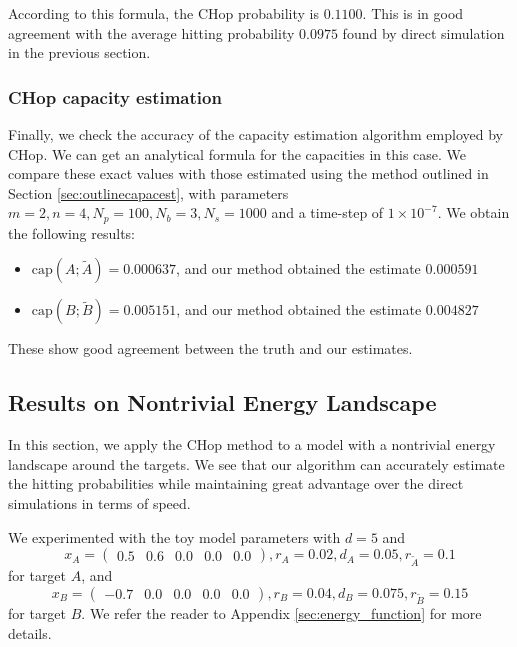 \documentclass[english, aip, jcp, priprint, graphicx,floatfix]{revtex4-1}
\theoremstyle{plain}
\theoremstyle{definition}
\theoremstyle{plain}
\newcommand{\capac}[2]{\mathrm{cap}\left(#1;#2\right)}
\begin{document}
According to this formula, the CHop probability is $0.1100$.  This is in good agreement with the average hitting probability $0.0975$ found by direct simulation in the previous section.


\subsubsection{CHop capacity estimation}



Finally, we check the accuracy of the capacity estimation algorithm employed by CHop.  We can get an analytical formula for the capacities in this case.  We compare these exact values with those estimated using the method outlined in Section \ref{sec:outlinecapacest}, with parameters $m = 2, n = 4, 
N_p = 100, N_b = 3,
N_s = 1000
$ and a time-step of $1 \times 10^{-7}$.  We obtain the following results:

\begin{itemize}
\item $\capac{A}{\tilde{A}}= 0.000637 $, and our method obtained the estimate $0.000591$ 
\item $\capac{B}{\tilde{B}}= 0.005151 $, and our method obtained the estimate $0.004827$ 
\end{itemize}

These show good agreement between the truth and our estimates.

\subsection{Results on Nontrivial Energy Landscape}




In this section, we apply the CHop method to a model with a nontrivial energy landscape around the targets. We see that our algorithm can accurately estimate the hitting probabilities while maintaining great advantage over the direct simulations in terms of speed.

We experimented with the toy model parameters with $d = 5$ and
\begin{equation*}
x_A = \begin{pmatrix}%
0.5&0.6&0.0&0.0&0.0%
\end{pmatrix},
r_A = 0.02,
d_A = 0.05,
r_{\tilde{A}} = 0.1
\end{equation*}
for target $A$, and
\begin{equation*}
x_B = \begin{pmatrix}%
-0.7&0.0&0.0&0.0&0.0%
\end{pmatrix},
r_B = 0.04,
d_B = 0.075,
r_{\tilde{B}} = 0.15
\end{equation*}
for target $B$. We refer the reader to Appendix \ref{sec:energy_function} for more details.
\end{document}

